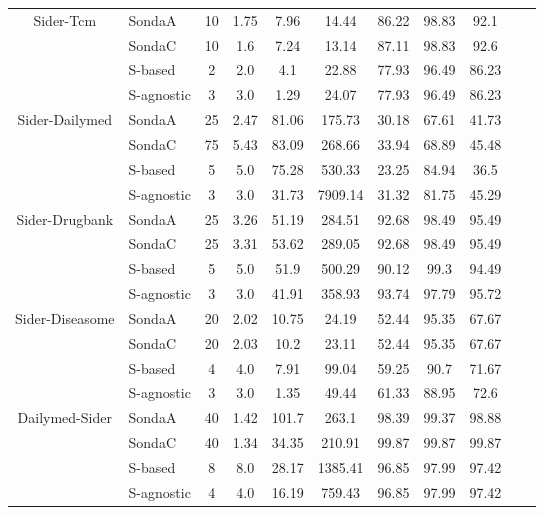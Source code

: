 \begin{center}
\begin{table*}[h]
\begin{tabular}{|c|l|c|c|c|c|c|c|c|c|c|}
 \multirow{4}{*}{Sider-Tcm} & SondaA         & 10 & 1.75   & 7.96  & 14.44   & 86.22 & 98.83 & 92.1     \\
 											& SondaC    & 10 & 1.6   & 7.24  & 13.14   & 87.11 & 98.83 & 92.6 \\
											& S-based   & 2 & 2.0   & 4.1  & 22.88   & 77.93 & 96.49 & 86.23 \\
 											& S-agnostic      & 3 & 3.0   & 1.29  & 24.07   & 77.93 & 96.49 & 86.23    \\ \hline
 											
\multirow{4}{*}{Sider-Dailymed} & SondaA   & 25 & 2.47   & 81.06  & 175.73   & 30.18 & 67.61 & 41.73   \\
											& SondaC  & 75 & 5.43   & 83.09  & 268.66    & 33.94 & 68.89 & 45.48 \\
											& S-based    & 5 & 5.0   & 75.28  & 530.33 & 23.25 & 84.94 & 36.5 \\
 											& S-agnostic     & 3 & 3.0   & 31.73  & 7909.14      & 31.32 & 81.75 & 45.29 \\ \hline 		
 																							
\multirow{4}{*}{Sider-Drugbank} & SondaA  & 25 & 3.26   & 51.19  & 284.51 & 92.68 & 98.49 & 95.49   \\
											& SondaC   & 25 & 3.31   & 53.62  & 289.05 & 92.68 & 98.49 & 95.49  \\
											& S-based    & 5 & 5.0   & 51.9  & 500.29   & 90.12 & 99.3 & 94.49\\
 											& S-agnostic      & 3 & 3.0   & 41.91  & 358.93 & 93.74 & 97.79 & 95.72  \\ \hline 											

\multirow{4}{*}{Sider-Diseasome} & SondaA    & 20 & 2.02   & 10.75  & 24.19     & 52.44 & 95.35 & 67.67\\
											& SondaC    & 20 & 2.03   & 10.2  & 23.11 & 52.44 & 95.35 & 67.67  \\
											& S-based    & 4 & 4.0   & 7.91  & 99.04  & 59.25 & 90.7 & 71.67\\
 											& S-agnostic    & 3 & 3.0   & 1.35  & 49.44  & 61.33 & 88.95 & 72.6      \\ \hline 		 									

\multirow{4}{*}{Dailymed-Sider} & SondaA    & 40 & 1.42   & 101.7  & 263.1   & 98.39 & 99.37 & 98.88  \\
											& SondaC  & 40 & 1.34   & 34.35  & 210.91  & 99.87 & 99.87 & 99.87 \\
											& S-based    & 8 & 8.0   & 28.17  & 1385.41  & 96.85 & 97.99 & 97.42\\
 											& S-agnostic    & 4 & 4.0   & 16.19  & 759.43    & 96.85 & 97.99 & 97.42  \\ \hline 		


\end{tabular}
\end{table*}
\end{center}

